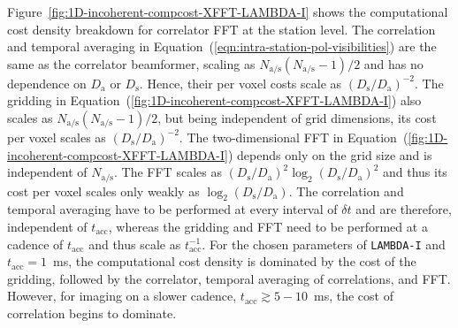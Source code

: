 \documentclass[
  journal=pasa,
  manuscript=article-type,
  year=2020,
  volume=37,
]{cup-journal}
\begin{document}


Figure~\ref{fig:1D-incoherent-compcost-XFFT-LAMBDA-I} shows the computational cost density breakdown for correlator FFT at the station level. The correlation and temporal averaging in Equation~(\ref{eqn:intra-station-pol-visibilities}) are the same as the correlator beamformer, scaling as $N_\textrm{a/s}(N_\textrm{a/s}-1)/2$ and has no dependence on $D_\textrm{a}$ or $D_\textrm{s}$. Hence, their per voxel costs scale as $(D_\textrm{s}/D_\textrm{a})^{-2}$. The gridding in Equation~(\ref{fig:1D-incoherent-compcost-XFFT-LAMBDA-I}) also scales as $N_\textrm{a/s}(N_\textrm{a/s}-1)/2$, but being independent of grid dimensions, its cost per voxel scales as $(D_\textrm{s}/D_\textrm{a})^{-2}$. The two-dimensional FFT in Equation~(\ref{fig:1D-incoherent-compcost-XFFT-LAMBDA-I}) depends only on the grid size and is independent of $N_\textrm{a/s}$. The FFT scales as $(D_\textrm{s}/D_\textrm{a})^2\log_2(D_\textrm{s}/D_\textrm{a})^2$ and thus its cost per voxel scales only weakly as $\log_2(D_\textrm{s}/D_\textrm{a})$. The correlation and temporal averaging have to be performed at every interval of $\delta t$ and are therefore, independent of $t_\textrm{acc}$, whereas the gridding and FFT need to be performed at a cadence of $t_\textrm{acc}$ and thus scale as $t_\textrm{acc}^{-1}$. For the chosen parameters of \texttt{LAMBDA-I} and $t_\textrm{acc}=1$~ms, the computational cost density is dominated by the cost of the gridding, followed by the correlator, temporal averaging of correlations, and FFT. However, for imaging on a slower cadence, $t_\textrm{acc}\gtrsim 5-10$~ms, the cost of correlation begins to dominate. 
\end{document}
